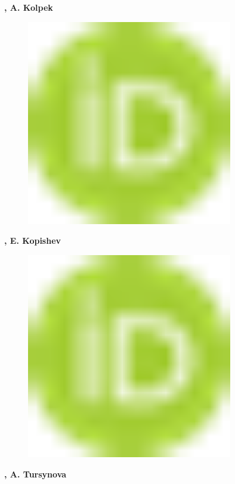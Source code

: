 {\bfseries , A.
Kolpek}
\begin{figure}[H]
	\centering
	\includegraphics[width=0.8\textwidth]{media/chem/image1}
	\caption*{}
\end{figure}
{\bfseries ,
E.
Kopishev}
\begin{figure}[H]
	\centering
	\includegraphics[width=0.8\textwidth]{media/chem/image1}
	\caption*{}
\end{figure}
{\bfseries ,
A.
Tursynova}
